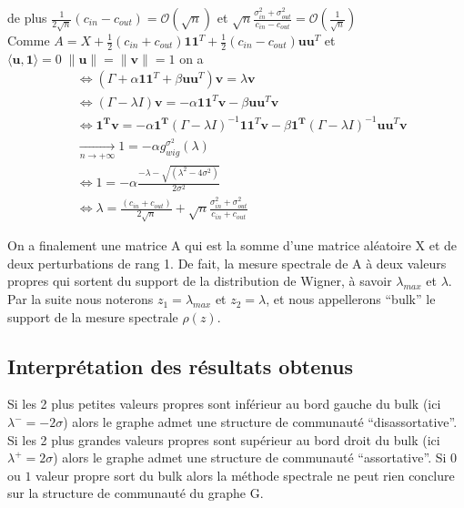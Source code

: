 de plus $\frac{1}{2\sqrt{n}}(c_{in} - c_{out}) = \mathcal{O}(\sqrt{n})$ et $\sqrt{n}\frac{\sigma_{in}^2 + \sigma_{out}^2}{c_{in} - c_{out}} =  \mathcal{O}\left(\frac{1}{\sqrt{n}}\right)$\\
 
Comme $A = X + \frac{1}{2}(c_{in} + c_{out})\mathbf{11}^T + \frac{1}{2}(c_{in} - c_{out})\mathbf{uu}^T$ et $\langle\mathbf{u}, \mathbf{1}\rangle = 0 \; \|\mathbf{u}\|=\|\mathbf{v}\|=1$ on a
\begin{align}
	&\Leftrightarrow (\Gamma + \alpha\mathbf{11}^T + \beta \mathbf{uu}^T)\mathbf{v} = \lambda \mathbf{v}\nonumber\\
	&\Leftrightarrow (\Gamma - \lambda I)\mathbf{v} = -\alpha\mathbf{11}^T\mathbf{v} - \beta \mathbf{uu}^T\mathbf{v} \nonumber\\
	&\Leftrightarrow \mathbf{1^Tv} = -\alpha\mathbf{1^T} (\Gamma - \lambda I)^{-1}\mathbf{11}^T\mathbf{v} - \beta \mathbf{1^T} (\Gamma - \lambda I)^{-1}\mathbf{uu}^T\mathbf{v} \nonumber\\
	&\xrightarrow[n \to +\infty]{} 1 = -\alpha g_{wig}^{\sigma^2}(\lambda) \nonumber\\
	&\Leftrightarrow 1 = -\alpha  \frac{- \lambda - \sqrt{(\lambda^2 - 4\sigma^2)}}{2\sigma^2}\nonumber\\
	&\Leftrightarrow \boxed{\lambda = \frac{(c_{in} + c_{out})}{2\sqrt{n}} + \sqrt{n}\frac{\sigma_{in}^2 + \sigma_{out}^2}{c_{in} + c_{out}}} \label{z_2}
\end{align} 

On a finalement une matrice A qui est la somme d'une matrice aléatoire X et de deux perturbations de rang 1.
De fait, la mesure spectrale de A à deux valeurs propres qui sortent du support de la distribution de Wigner, à savoir $\lambda_{max}$ et $\lambda$.
Par la suite nous noterons $z_1 = \lambda_{max}$ et $z_2 = \lambda$, et nous appellerons ``bulk'' le support de la mesure spectrale $\rho(z)$.

\subsection{Interprétation des résultats obtenus}
\label{subsec:1.3}
Si les 2 plus petites valeurs propres sont inférieur au bord gauche du bulk (ici $\lambda^- = -2\sigma$) alors le graphe admet une structure de communauté ``disassortative''.
Si les 2 plus grandes valeurs propres sont supérieur au bord droit du bulk (ici $\lambda^+ = 2\sigma$) alors le graphe admet une structure de communauté ``assortative''.
Si $0$ ou $1$ valeur propre sort du bulk alors la méthode spectrale ne peut rien conclure sur la structure de communauté du graphe G.\\

